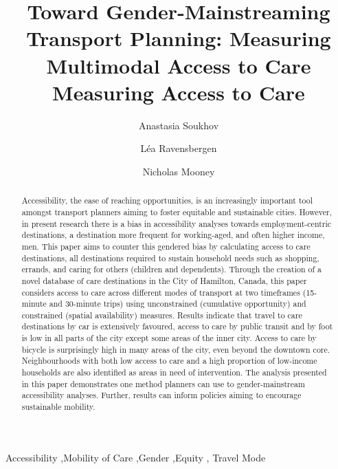 \documentclass[
  super,
  preprint,
  3p]{elsarticle}
\begin{document}
\begin{frontmatter}
\title{Toward Gender-Mainstreaming Transport Planning: Measuring
Multimodal Access to Care \\\large{Measuring Access to Care} }
\author[1]{Anastasia Soukhov%
%
}
\author[1]{Léa Ravensbergen%
%
}
\author[1]{Nicholas Mooney%
%
}





        
\begin{abstract}
Accessibility, the ease of reaching opportunities, is an increasingly
important tool amongst transport planners aiming to foster equitable and
sustainable cities. However, in present research there is a bias in
accessibility analyses towards employment-centric destinations, a
destination more frequent for working-aged, and often higher income,
men. This paper aims to counter this gendered bias by calculating access
to care destinations, all destinations required to sustain household
needs such as shopping, errands, and caring for others (children and
dependents). Through the creation of a novel database of care
destinations in the City of Hamilton, Canada, this paper considers
access to care across different modes of transport at two timeframes
(15-minute and 30-minute trips) using unconstrained (cumulative
opportunity) and constrained (spatial availability) measures. Results
indicate that travel to care destinations by car is extensively
favoured, access to care by public transit and by foot is low in all
parts of the city except some areas of the inner city. Access to care by
bicycle is surprisingly high in many areas of the city, even beyond the
downtown core. Neighbourhoods with both low access to care and a high
proportion of low-income households are also identified as areas in need
of intervention. The analysis presented in this paper demonstrates one
method planners can use to gender-mainstream accessibility analyses.
Further, results can inform policies aiming to encourage sustainable
mobility.
\end{abstract}





\begin{keyword}
    Accessibility \sep Mobility of Care \sep Gender \sep Equity \sep 
    Travel Mode
\end{keyword}
\end{frontmatter}
    \ifdefined\Shaded\renewenvironment{Shaded}{\begin{tcolorbox}[interior hidden, enhanced, frame hidden, sharp corners, boxrule=0pt, breakable, borderline west={3pt}{0pt}{shadecolor}]}{\end{tcolorbox}}\fi
\end{document}
